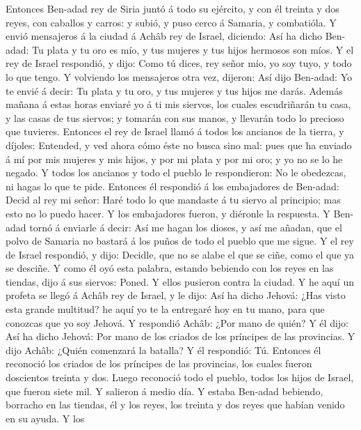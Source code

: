  Entonces Ben-adad rey de Siria juntó á todo su ejército, y
con él treinta y dos reyes, con caballos y carros: y subió, y puso cerco
á Samaria, y combatióla.  Y envió mensajeros á la ciudad á
Achâb rey de Israel, diciendo:  Así ha dicho Ben-adad: Tu
plata y tu oro es mío, y tus mujeres y tus hijos hermosos son míos.
 Y el rey de Israel respondió, y dijo: Como tú dices, rey
señor mío, yo soy tuyo, y todo lo que tengo.  Y volviendo
los mensajeros otra vez, dijeron: Así dijo Ben-adad: Yo te envié á
decir: Tu plata y tu oro, y tus mujeres y tus hijos me darás.
 Además mañana á estas horas enviaré yo á ti mis siervos,
los cuales escudriñarán tu casa, y las casas de tus siervos; y tomarán
con sus manos, y llevarán todo lo precioso que tuvieres. 
Entonces el rey de Israel llamó á todos los ancianos de la tierra, y
díjoles: Entended, y ved ahora cómo éste no busca sino mal: pues que ha
enviado á mí por mis mujeres y mis hijos, y por mi plata y por mi oro; y
yo no se lo he negado.  Y todos los ancianos y todo el
pueblo le respondieron: No le obedezcas, ni hagas lo que te pide.
 Entonces él respondió á los embajadores de Ben-adad: Decid
al rey mi señor: Haré todo lo que mandaste á tu siervo al principio; mas
esto no lo puedo hacer. Y los embajadores fueron, y diéronle la
respuesta.  Y Ben-adad tornó á enviarle á decir: Así me
hagan los dioses, y así me añadan, que el polvo de Samaria no bastará á
los puños de todo el pueblo que me sigue.  Y el rey de
Israel respondió, y dijo: Decidle, que no se alabe el que se ciñe, como
el que ya se desciñe.  Y como él oyó esta palabra, estando
bebiendo con los reyes en las tiendas, dijo á sus siervos: Poned. Y
ellos pusieron contra la ciudad.  Y he aquí un profeta se
llegó á Achâb rey de Israel, y le dijo: Así ha dicho Jehová: ¿Has visto
esta grande multitud? he aquí yo te la entregaré hoy en tu mano, para
que conozcas que yo soy Jehová.  Y respondió Achâb: ¿Por
mano de quién? Y él dijo: Así ha dicho Jehová: Por mano de los criados
de los príncipes de las provincias. Y dijo Achâb: ¿Quién comenzará la
batalla? Y él respondió: Tú.  Entonces él reconoció los
criados de los príncipes de las provincias, los cuales fueron doscientos
treinta y dos. Luego reconoció todo el pueblo, todos los hijos de
Israel, que fueron siete mil.  Y salieron á medio día. Y
estaba Ben-adad bebiendo, borracho en las tiendas, él y los reyes, los
treinta y dos reyes que habían venido en su ayuda.  Y los
